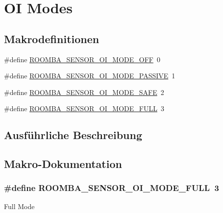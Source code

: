 \hypertarget{group__roomba__oi__modes}{\section{O\-I Modes}
\label{group__roomba__oi__modes}
}
\subsection*{Makrodefinitionen}
\begin{DoxyCompactItemize}
\item 
\#define \hyperlink{group__roomba__oi__modes_ga161260ace993af2492a2edcc0110838d}{R\-O\-O\-M\-B\-A\-\_\-\-S\-E\-N\-S\-O\-R\-\_\-\-O\-I\-\_\-\-M\-O\-D\-E\-\_\-\-O\-F\-F}~0
\item 
\#define \hyperlink{group__roomba__oi__modes_ga66261dece9fcb24410381451bde2c953}{R\-O\-O\-M\-B\-A\-\_\-\-S\-E\-N\-S\-O\-R\-\_\-\-O\-I\-\_\-\-M\-O\-D\-E\-\_\-\-P\-A\-S\-S\-I\-V\-E}~1
\item 
\#define \hyperlink{group__roomba__oi__modes_gac946396edec6f2dcdb9dff6d23453da4}{R\-O\-O\-M\-B\-A\-\_\-\-S\-E\-N\-S\-O\-R\-\_\-\-O\-I\-\_\-\-M\-O\-D\-E\-\_\-\-S\-A\-F\-E}~2
\item 
\#define \hyperlink{group__roomba__oi__modes_ga6d0c469802b4fae5e9dddb922c0a1a6c}{R\-O\-O\-M\-B\-A\-\_\-\-S\-E\-N\-S\-O\-R\-\_\-\-O\-I\-\_\-\-M\-O\-D\-E\-\_\-\-F\-U\-L\-L}~3
\end{DoxyCompactItemize}


\subsection{Ausführliche Beschreibung}


\subsection{Makro-\/\-Dokumentation}
\hypertarget{group__roomba__oi__modes_ga6d0c469802b4fae5e9dddb922c0a1a6c}{
\subsubsection[{R\-O\-O\-M\-B\-A\-\_\-\-S\-E\-N\-S\-O\-R\-\_\-\-O\-I\-\_\-\-M\-O\-D\-E\-\_\-\-F\-U\-L\-L}]{\setlength{\rightskip}{0pt plus 5cm}\#define R\-O\-O\-M\-B\-A\-\_\-\-S\-E\-N\-S\-O\-R\-\_\-\-O\-I\-\_\-\-M\-O\-D\-E\-\_\-\-F\-U\-L\-L~3}}\label{group__roomba__oi__modes_ga6d0c469802b4fae5e9dddb922c0a1a6c}
Full Mode

